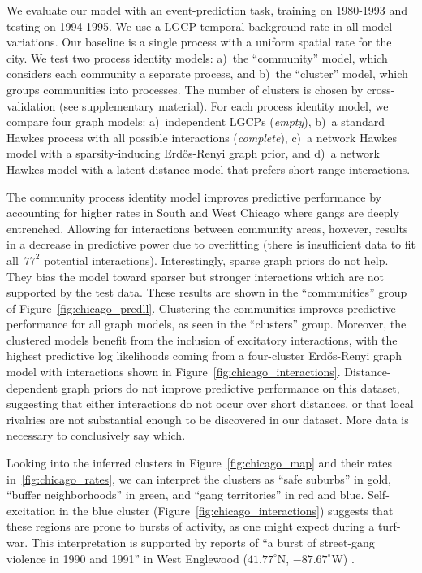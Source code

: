 We evaluate our model with an event-prediction task, training on
1980-1993 and testing on 1994-1995. We use a LGCP temporal background
rate in all model variations. Our baseline is a single process with a
uniform spatial rate for the city.  We test two process identity
models: a)~the ``community'' model, which considers each community a
separate process, and b)~the ``cluster'' model, which groups
communities into processes. The number of clusters is chosen by
cross-validation (see supplementary material). For each process
identity model, we compare four graph models: a)~independent LGCPs
(\emph{empty}), b)~a standard Hawkes process with all possible
interactions (\emph{complete}), c)~a network Hawkes model with a
sparsity-inducing Erd\H{o}s-Renyi graph prior, and d)~a network Hawkes
model with a latent distance model that prefers short-range
interactions.

The community process identity model improves predictive performance
by accounting for higher rates in South and West Chicago where gangs
are deeply entrenched. Allowing for interactions between community
areas, however, results in a decrease in predictive power due to
overfitting (there is insufficient data to fit all~${77^2}$ potential
interactions). Interestingly, sparse graph priors do not help. They
bias the model toward sparser but stronger interactions which are not
supported by the test data. These results are shown in the
``communities'' group of Figure~\ref{fig:chicago_predll}. Clustering
the communities improves predictive performance for all graph models,
as seen in the ``clusters'' group. Moreover, the clustered models
benefit from the inclusion of excitatory interactions, with the
highest predictive log likelihoods coming from a four-cluster
Erd\H{o}s-Renyi graph model with interactions shown in
Figure~\ref{fig:chicago_interactions}. Distance-dependent graph priors
do not improve predictive performance on this dataset, suggesting that
either interactions do not occur over short distances, or that local
rivalries are not substantial enough to be discovered in our
dataset. More data is necessary to conclusively say which.

Looking into the inferred clusters in Figure~\ref{fig:chicago_map} and
their rates in~\ref{fig:chicago_rates}, we can interpret the clusters
as ``safe suburbs'' in gold, ``buffer neighborhoods'' in green, and
``gang territories'' in red and blue. Self-excitation in the blue
cluster (Figure~\ref{fig:chicago_interactions}) suggests that these
regions are prone to bursts of activity, as one might expect during a
turf-war. This interpretation is supported by reports of ``a burst of
street-gang violence in 1990 and 1991'' in West Englewood
(${41.77^\circ}$N, ${-87.67^\circ}$W) \cite{Block-1993}.

